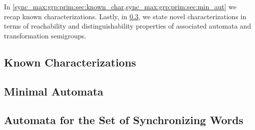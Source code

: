
In \cref{sync_max:grp:prim:sec:known_char,sync_max:grp:prim:sec:min_aut} we recap
known characterizations.
Lastly, in \cref{sync_max:perm:sec:aut_sync_words}, 
we state novel characterizations
in terms of reachability and distinguishability properties
of associated automata and transformation semigroups.

\subsection{Known Characterizations} 
\label{sync_max:grp:prim:sec:known_char}



\subsection{Minimal Automata}
\label{sync_max:grp:prim:sec:min_aut} 



\subsection{Automata for the Set of Synchronizing Words}
\label{sync_max:perm:sec:aut_sync_words}

